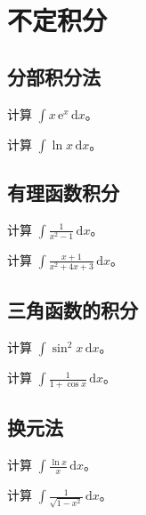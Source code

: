 \documentclass[pad]{kazetex}
\begin{document}
\section{不定积分}

\subsection{分部积分法}

\begin{problem}
  计算 $\displaystyle\int x\,\mathrm{e}^{x}\,\mathrm{d}x$。
\end{problem}

\begin{problem}
  计算 $\displaystyle\int \ln x\,\mathrm{d}x$。
\end{problem}

\subsection{有理函数积分}

\begin{problem}
  计算 $\displaystyle\int \frac{1}{x^2-1}\,\mathrm{d}x$。
\end{problem}

\begin{problem}
  计算 $\displaystyle\int \frac{x+1}{x^2+4x+3}\,\mathrm{d}x$。
\end{problem}

\subsection{三角函数的积分}

\begin{problem}
  计算 $\displaystyle\int \sin^2 x\,\mathrm{d}x$。
\end{problem}

\begin{problem}
  计算 $\displaystyle\int \frac{1}{1+\cos x}\,\mathrm{d}x$。
\end{problem}

\subsection{换元法}

\begin{problem}
  计算 $\displaystyle\int \frac{\ln x}{x}\,\mathrm{d}x$。
\end{problem}

\begin{problem}
  计算 $\displaystyle\int \frac{1}{\sqrt{1-x^2}}\,\mathrm{d}x$。
\end{problem}
\end{document}
